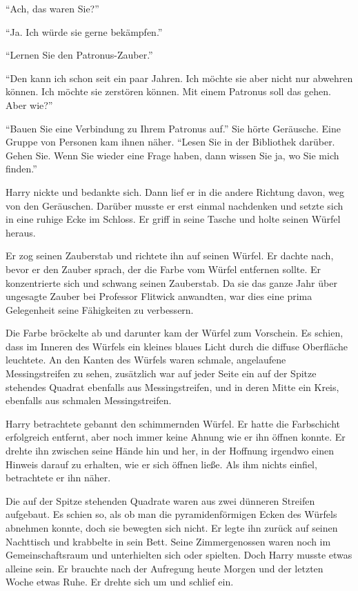 \enquote{Ach, das waren Sie?}

\enquote{Ja. Ich würde sie gerne bekämpfen.}

\enquote{Lernen Sie den Patronus-Zauber.}

\enquote{Den kann ich schon seit ein paar Jahren. Ich möchte sie aber nicht nur abwehren können. Ich möchte sie zerstören können. Mit einem Patronus soll das gehen. Aber wie?}

\enquote{Bauen Sie eine Verbindung zu Ihrem Patronus auf.} Sie hörte Geräusche. Eine Gruppe von Personen kam ihnen näher. \enquote{Lesen Sie in der Bibliothek darüber. Gehen Sie. Wenn Sie wieder eine Frage haben, dann wissen Sie ja, wo Sie mich finden.}

Harry nickte und bedankte sich. Dann lief er in die andere Richtung davon, weg von den Geräuschen. Darüber musste er erst einmal nachdenken und setzte sich in eine ruhige Ecke im Schloss. Er griff in seine Tasche und holte seinen Würfel heraus.

Er zog seinen Zauberstab und richtete ihn auf seinen Würfel. Er dachte nach, bevor er den Zauber sprach, der die Farbe vom Würfel entfernen sollte. Er konzentrierte sich und schwang seinen Zauberstab. Da sie das ganze Jahr über ungesagte Zauber bei Professor Flitwick anwandten, war dies eine prima Gelegenheit seine Fähigkeiten zu verbessern.

Die Farbe bröckelte ab und darunter kam der Würfel zum Vorschein. Es schien, dass im Inneren des Würfels ein kleines blaues Licht durch die diffuse Oberfläche leuchtete. An den Kanten des Würfels waren schmale, angelaufene Messingstreifen zu sehen, zusätzlich war auf jeder Seite ein auf der Spitze stehendes Quadrat ebenfalls aus Messingstreifen, und in deren Mitte ein Kreis, ebenfalls aus schmalen Messingstreifen.

Harry betrachtete gebannt den schimmernden Würfel. Er hatte die Farbschicht erfolgreich entfernt, aber noch immer keine Ahnung wie er ihn öffnen konnte. Er drehte ihn zwischen seine Hände hin und her, in der Hoffnung irgendwo einen Hinweis darauf zu erhalten, wie er sich öffnen ließe. Als ihm nichts einfiel, betrachtete er ihn näher.

Die auf der Spitze stehenden Quadrate waren aus zwei dünneren Streifen aufgebaut. Es schien so, als ob man die pyramidenförmigen Ecken des Würfels abnehmen konnte, doch sie bewegten sich nicht. Er legte ihn zurück auf seinen Nachttisch und krabbelte in sein Bett. Seine Zimmergenossen waren noch im Gemeinschaftsraum und unterhielten sich oder spielten. Doch Harry musste etwas alleine sein. Er brauchte nach der Aufregung heute Morgen und der letzten Woche etwas Ruhe. Er drehte sich um und schlief ein.

